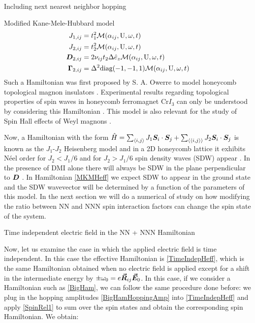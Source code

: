 \begin{section}{Including next nearest neighbor hopping}
\begin{subsection}{Modified Kane-Mele-Hubbard model}
\begin{align*}
J_{1,ij} &= t_1^2\mathcal{M}(\alpha_{ij}, \text{U}, \omega, t) \\
J_{2,ij} &= t_2^2\mathcal{M}(\alpha_{ij}, \text{U}, \omega, t) \\
\boldsymbol{D}_{2,ij} &= 2\nu_{ij} t_2 \Delta \hat{e}_z \mathcal{M}(\alpha_{ij}, \text{U}, \omega, t) \\
\boldsymbol{\Gamma}_{2,ij} &= \Delta^2 \text{diag}(-1,-1,1) \mathcal{M}(\alpha_{ij}, \text{U}, \omega, t) 
\end{align*}
Such a Hamiltonian was first proposed by S. A. Owerre to model honeycomb topological magnon insulators \cite{Owerre2016} \cite{Elyasi2018}. Experimental results regarding topological properties of spin waves in honeycomb ferromagnet Cr$I_3$ can only be understood by considering this Hamiltonian \cite{Chen2018}. This model is also relevant for the study of Spin Hall effects of Weyl magnons \cite{Zyuzin2018} \cite{Sekine2016}.

Now, a Hamiltonian with the form $\hat{H} = \sum_{\langle i,j \rangle} J_1 \boldsymbol{S}_i\cdot\boldsymbol{S}_j + \sum_{\langle \langle i,j \rangle \rangle} J_2\boldsymbol{S}_i\cdot\boldsymbol{S}_j$ is known as the $J_1$-$J_2$ Heisenberg model and in a 2D honeycomb lattice it exhibits N\'eel order for $J_2 < J_1 / 6$ and for $J_2 > J_1 / 6$ spin density waves (SDW) appear \cite{Mulder2010}. In the presence of DMI alone there will always be SDW in the plane perpendicular to $\boldsymbol{D}$ \cite{Uchida2006}. In Hamiltonian \ref{MKMHeff} we expect SDW to appear in the ground state and the SDW wavevector will be determined by a function of the parameters of this model. In the next section we will do a numerical of study on how modifying the ratio between NN and NNN spin interaction factors can change the spin state of the system.

\end{subsection}

\begin{subsection}{Time independent electric field in the NN + NNN Hamiltonian}

Now, let us examine the case in which the applied electric field is time independent. In this case the effective Hamiltonian is \ref{TimeIndepHeff}, which is the same Hamiltonian obtained when no electric field is applied except for a shift in the intermediate energy by $\pm \omega_0 = e\boldsymbol{\vec{R}}_{ij}\boldsymbol{\vec{E}}_0$. In this case, if we consider a Hamiltonian such as \ref{BigHam}, we can follow the same procedure done before: we plug in the hopping amplitudes \ref{BigHamHoppingAmp} into \ref{TimeIndepHeff} and apply \ref{SpinRel1} to sum over the spin states and obtain the corresponding spin Hamiltonian. We obtain:


\end{subsection}
\end{section}
